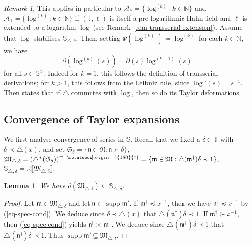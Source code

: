 \documentclass{article}
\newcommand{\assign}{\coloneqq}
\newcommand{\suchthat}{:}
\newcommand{\tmop}[1]{\ensuremath{\operatorname{#1}}}
\newtheorem{lemma}[theorem]{Lemma}
\theoremstyle{remark}\newtheorem*{convention*}{Convention}
\newtheorem{remark}[theorem]{Remark}
\begin{document}
\begin{remark}
  \label{rem-log-compatibility}This applies in particular to
  $\mathcal{A}_{\mathbb{S}} = \{\log^{(k)} \suchthat k \in \mathbb{N}\}$ and
  $\mathcal{A}_{\mathbb{T}} = \{\log^{(k)} \suchthat k \in \mathbb{N}\}$ if
  $(\mathbb{T}, \ell)$ is itself a pre-logarithmic Hahn field and $\ell$ is
  extended to a logarithm $\log$ (see Remark~\ref{rem-transserial-extension}).
  Assume that $\log$ stabilises $\mathbb{S}_{\triangle, \delta}$. Then,
  setting $\Psi (\log^{(k)}) \assign \log^{(k)}$ for each $k \in \mathbb{N}$,
  we have
  \[ \partial (\log^{(k)} (s)) = \partial (s) \log^{(k + 1)} (s) \]
  for all $s \in \mathbb{S}^{>}$. Indeed for $k = 1$, this follows the
  definition of transserial derivations; for $k > 1$, this follows from the
  Leibniz rule, since $\log' (s) = s^{- 1}$. Then 
  states that if $\triangle$ commutes with $\log$, then so do its Taylor
  deformations.
\end{remark}

\subsection{Convergence of Taylor expansions}

We first analyse convergence of series in $\mathbb{S}$. Recall that we fixed a
$\delta \in \mathbb{T}$ with $\delta \prec \triangle (x)$, and set
$\mathfrak{S}_{\delta} = \{\mathfrak{n} \in \mathfrak{N} \suchthat
\mathfrak{n} \succ \delta\}$, $\mathfrak{M}_{\triangle, \delta} = \left(
{\triangle^{\ast}}^{} (\mathfrak{S}_{\delta}) \right)^-
\;^{\rotatebox[origin=c]{180}{\ensuremath{\dag}}} = \{\mathfrak{m} \in
\mathfrak{M} \suchthat \triangle (\mathfrak{m}^{\dag}) \delta \prec 1\}$,
$\mathbb{S}_{\triangle, \delta} =\mathbb{R} \llbracket
\mathfrak{M}_{\triangle, \delta} \rrbracket$.

\begin{lemma}
  \label{lem-diff-subfield}We have $\partial (\mathfrak{M}_{\triangle,
  \delta}) \subseteq \mathbb{S}_{\triangle, \delta}$.
\end{lemma}

\begin{proof}
  Let $\mathfrak{m} \in \mathfrak{M}_{\triangle, \delta}$ and let
  $\mathfrak{n} \in \tmop{supp} \mathfrak{m}'$. If $\mathfrak{m}^{\dag}
  \preccurlyeq x^{- 1}$, then we have $\mathfrak{n}^{\dag} \preccurlyeq x^{-
  1}$ by (\ref{eq-spec-cond}). We deduce since $\delta \prec \triangle (x)$
  that $\triangle (\mathfrak{n}^{\dag}) \delta \prec 1$. If
  $\mathfrak{m}^{\dag} \succ x^{- 1}$, then (\ref{eq-spec-cond}) yields
  $\mathfrak{n}^{\dag} \asymp \mathfrak{m}^{\dag}$. We deduce since $\triangle
  (\mathfrak{m}^{\dag}) \delta \prec 1$ that $\triangle (\mathfrak{n}^{\dag})
  \delta \prec 1$. Thus $\tmop{supp} \mathfrak{m}' \subseteq
  \mathfrak{M}_{\triangle, \delta}$.
\end{proof}
\end{document}
